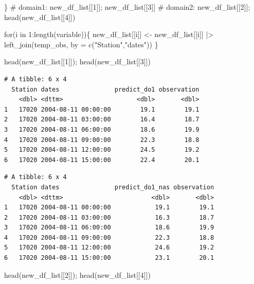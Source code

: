 \documentclass[
  letterpaper,
  DIV=11,
  numbers=noendperiod,
  abstract]{scrartcl}
\newenvironment{Shaded}{\begin{snugshade}}{\end{snugshade}}
\newcommand{\AttributeTok}[1]{\textcolor[rgb]{0.40,0.45,0.13}{#1}}
\newcommand{\CommentTok}[1]{\textcolor[rgb]{0.37,0.37,0.37}{#1}}
\newcommand{\ControlFlowTok}[1]{\textcolor[rgb]{0.00,0.23,0.31}{#1}}
\newcommand{\DecValTok}[1]{\textcolor[rgb]{0.68,0.00,0.00}{#1}}
\newcommand{\FunctionTok}[1]{\textcolor[rgb]{0.28,0.35,0.67}{#1}}
\newcommand{\NormalTok}[1]{\textcolor[rgb]{0.00,0.23,0.31}{#1}}
\newcommand{\OtherTok}[1]{\textcolor[rgb]{0.00,0.23,0.31}{#1}}
\newcommand{\SpecialCharTok}[1]{\textcolor[rgb]{0.37,0.37,0.37}{#1}}
\newcommand{\StringTok}[1]{\textcolor[rgb]{0.13,0.47,0.30}{#1}}
\begin{document}
\begin{Shaded}
\begin{Highlighting}[]
\NormalTok{                            \}}
\CommentTok{\# domain1: new\_df\_list[[1]]; new\_df\_list[[3]]}
\CommentTok{\# domain2: new\_df\_list[[2]]; head(new\_df\_list[[4]])}

\ControlFlowTok{for}\NormalTok{(i }\ControlFlowTok{in} \DecValTok{1}\SpecialCharTok{:}\FunctionTok{length}\NormalTok{(variable))\{}
\NormalTok{new\_df\_list[[i]] }\OtherTok{\textless{}{-}} 
\NormalTok{      new\_df\_list[[i]] }\SpecialCharTok{|\textgreater{}}        
        \FunctionTok{left\_join}\NormalTok{(temp\_obs, }\AttributeTok{by =} \FunctionTok{c}\NormalTok{(}\StringTok{"Station"}\NormalTok{,}\StringTok{"dates"}\NormalTok{))}
\NormalTok{                            \}}
  
\FunctionTok{head}\NormalTok{(new\_df\_list[[}\DecValTok{1}\NormalTok{]]); }\FunctionTok{head}\NormalTok{(new\_df\_list[[}\DecValTok{3}\NormalTok{]])}
\end{Highlighting}
\end{Shaded}

\begin{verbatim}
# A tibble: 6 x 4
  Station dates               predict_do1 observation
    <dbl> <dttm>                    <dbl>       <dbl>
1   17020 2004-08-11 00:00:00        19.1        19.1
2   17020 2004-08-11 03:00:00        16.4        18.7
3   17020 2004-08-11 06:00:00        18.6        19.9
4   17020 2004-08-11 09:00:00        22.3        18.8
5   17020 2004-08-11 12:00:00        24.5        19.2
6   17020 2004-08-11 15:00:00        22.4        20.1
\end{verbatim}

\begin{verbatim}
# A tibble: 6 x 4
  Station dates               predict_do1_nas observation
    <dbl> <dttm>                        <dbl>       <dbl>
1   17020 2004-08-11 00:00:00            19.1        19.1
2   17020 2004-08-11 03:00:00            16.3        18.7
3   17020 2004-08-11 06:00:00            18.6        19.9
4   17020 2004-08-11 09:00:00            22.3        18.8
5   17020 2004-08-11 12:00:00            24.6        19.2
6   17020 2004-08-11 15:00:00            23.1        20.1
\end{verbatim}

\begin{Shaded}
\begin{Highlighting}[]
\FunctionTok{head}\NormalTok{(new\_df\_list[[}\DecValTok{2}\NormalTok{]]); }\FunctionTok{head}\NormalTok{(new\_df\_list[[}\DecValTok{4}\NormalTok{]])}
\end{Highlighting}
\end{Shaded}
\end{document}
